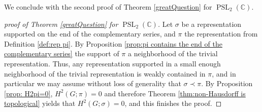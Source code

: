 \documentclass[12pt,reqno]{amsart}
\newcommand{\C}{\mathbb{C}}
\theoremstyle{definition}
\newcommand{\PSL}{\operatorname{PSL}}
\begin{document}
We conclude with the second proof of Theorem \ref{greatQuestion} for $\PSL_2(\C)$.
\begin{proof}[proof of Theorem \ref{greatQuestion} for $\PSL_2(\C)$]
    Let $\sigma$ be a representation supported on the end of the complementary series, and $\pi$ the representation from Definition \ref{def:rep pi}. By Proposition \ref{prop:pi contains the end of the complementary series} the support of $\pi$ a neighborhood of the trivial representation. Thus, any representation supported in a small enough neighborhood of the trivial representation is weakly contained in $\pi$, and in particular we may assume without loss of generality that $\sigma \prec \pi$. By Proposition \ref{prop: H2pi=0}, $H^2(G;\pi)=0$ and therefore Theorem \ref{thm:non-Hausdorff is topological} yields that $H^2(G;\sigma)=0$, and this finishes the proof.
\end{proof}
 


\end{document}
